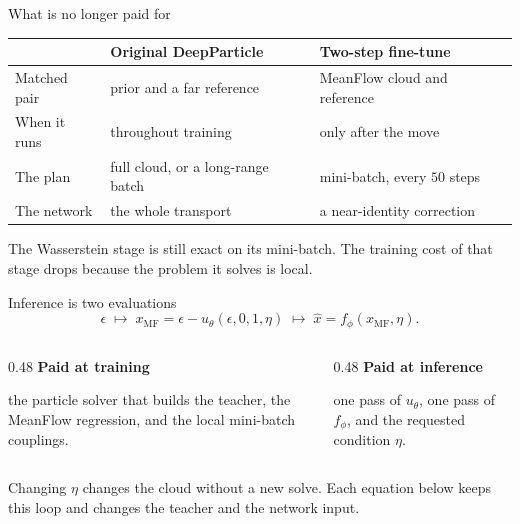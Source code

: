 \documentclass[aspectratio=169,11pt,t]{beamer}
\begin{document}
\begin{frame}{What is no longer paid for}
  \small
  \begin{tabular}{@{}lll@{}}
    \toprule
     & Original DeepParticle & Two-step fine-tune \\
    \midrule
    Matched pair & prior and a far reference & MeanFlow cloud and reference \\
    When it runs & throughout training & only after the move \\
    The plan & full cloud, or a long-range batch & mini-batch, every $50$ steps \\
    The network & the whole transport & a near-identity correction \\
    \bottomrule
  \end{tabular}
  \vspace{0.4em}
  \normalsize
  The Wasserstein stage is still exact on its mini-batch.
  The training cost of that stage drops because the problem it solves is local.
\end{frame}

\begin{frame}{Inference is two evaluations}
  \[
    \epsilon
    \;\longmapsto\;
    x_{\mathrm{MF}}=\epsilon-u_\theta(\epsilon,0,1,\eta)
    \;\longmapsto\;
    \hat x=f_\phi(x_{\mathrm{MF}},\eta).
  \]
  \vspace{0.25em}
  \begin{columns}[T,onlytextwidth]
    \begin{column}{0.48\textwidth}
      \textbf{Paid at training}\\[0.25em]
      \raggedright
      the particle solver that builds the teacher,
      the MeanFlow regression,
      and the local mini-batch couplings.
    \end{column}
    \begin{column}{0.48\textwidth}
      \textbf{Paid at inference}\\[0.25em]
      \raggedright
      one pass of $u_\theta$,
      one pass of $f_\phi$,
      and the requested condition $\eta$.
    \end{column}
  \end{columns}
  \vspace{0.4em}
  Changing $\eta$ changes the cloud without a new solve.
  Each equation below keeps this loop and changes the teacher and the network input.
\end{frame}
\end{document}
